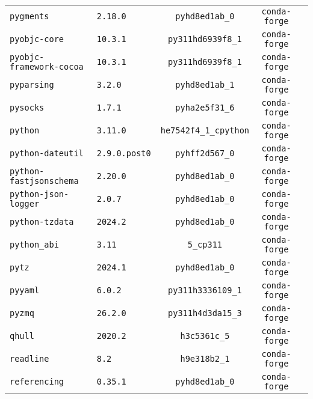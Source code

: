 \begin{longtable}{p{}|l|ccc}
\texttt{pygments}                  & \texttt{2.18.0}             & \texttt{pyhd8ed1ab\_0}    & \texttt{conda-forge}\\
\texttt{pyobjc-core}               & \texttt{10.3.1}             & \texttt{py311hd6939f8\_1} & \texttt{conda-forge}\\
\texttt{pyobjc-framework-cocoa}    & \texttt{10.3.1}             & \texttt{py311hd6939f8\_1} & \texttt{conda-forge}\\
\texttt{pyparsing}                 & \texttt{3.2.0}              & \texttt{pyhd8ed1ab\_1}    & \texttt{conda-forge}\\
\texttt{pysocks}                   & \texttt{1.7.1}              & \texttt{pyha2e5f31\_6}    & \texttt{conda-forge}\\
\texttt{python}                    & \texttt{3.11.0}             & \texttt{he7542f4\_1\_cpython} & \texttt{conda-forge}\\
\texttt{python-dateutil}           & \texttt{2.9.0.post0}        & \texttt{pyhff2d567\_0}    & \texttt{conda-forge}\\
\texttt{python-fastjsonschema}     & \texttt{2.20.0}             & \texttt{pyhd8ed1ab\_0}    & \texttt{conda-forge}\\
\texttt{python-json-logger}        & \texttt{2.0.7}              & \texttt{pyhd8ed1ab\_0}    & \texttt{conda-forge}\\
\texttt{python-tzdata}             & \texttt{2024.2}             & \texttt{pyhd8ed1ab\_0}    & \texttt{conda-forge}\\
\texttt{python\_abi}                & \texttt{3.11}               & \texttt{5\_cp311}         & \texttt{conda-forge}\\
\texttt{pytz}                      & \texttt{2024.1}             & \texttt{pyhd8ed1ab\_0}    & \texttt{conda-forge}\\
\texttt{pyyaml}                    & \texttt{6.0.2}              & \texttt{py311h3336109\_1} & \texttt{conda-forge}\\
\texttt{pyzmq}                     & \texttt{26.2.0}             & \texttt{py311h4d3da15\_3} & \texttt{conda-forge}\\
\texttt{qhull}                     & \texttt{2020.2}             & \texttt{h3c5361c\_5}      & \texttt{conda-forge}\\
\texttt{readline}                  & \texttt{8.2}                & \texttt{h9e318b2\_1}      & \texttt{conda-forge}\\
\texttt{referencing} & \texttt{0.35.1} & \texttt{pyhd8ed1ab\_0} & \texttt{conda-forge} \\

\end{longtable}
